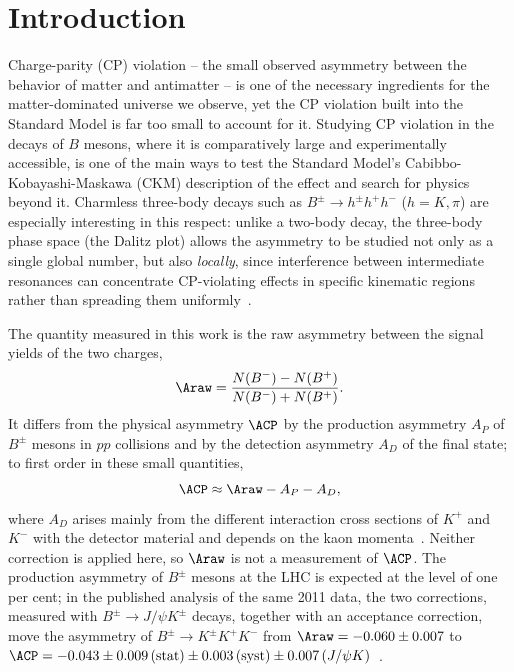 \section{Introduction}
\label{sec:intro}
Charge-parity (CP) violation -- the small observed asymmetry between the behavior of matter and antimatter -- is one of the necessary ingredients for the matter-dominated universe we observe, yet the CP violation built into the Standard Model is far too small to account for it. Studying CP violation in the decays of $B$ mesons, where it is comparatively large and experimentally accessible, is one of the main ways to test the Standard Model's Cabibbo-Kobayashi-Maskawa (CKM) description of the effect and search for physics beyond it. Charmless three-body decays such as $B^{\pm}\to h^{\pm}h^{+}h^{-}$ ($h=K,\pi$) are especially interesting in this respect: unlike a two-body decay, the three-body phase space (the Dalitz plot) allows the asymmetry to be studied not only as a single global number, but also \emph{locally}, since interference between intermediate resonances can concentrate CP-violating effects in specific kinematic regions rather than spreading them uniformly~\cite{lhcb_cpv_prd2023,lhcb_cpv_paper}.

The quantity measured in this work is the raw asymmetry between the signal yields of the two charges,
\begin{equation}
\Araw=\frac{N(B^-)-N(B^+)}{N(B^-)+N(B^+)} .
\label{eq:araw}
\end{equation}
It differs from the physical asymmetry $\ACP$ by the production asymmetry $A_P$ of $B^\pm$ mesons in $pp$ collisions and by the detection asymmetry $A_D$ of the final state; to first order in these small quantities,
\begin{equation}
\ACP\approx\Araw-A_P-A_D ,
\label{eq:acp}
\end{equation}
where $A_D$ arises mainly from the different interaction cross sections of $K^+$ and $K^-$ with the detector material and depends on the kaon momenta~\cite{lhcb_cpv_prd2023}. Neither correction is applied here, so $\Araw$ is not a measurement of $\ACP$. The production asymmetry of $B^\pm$ mesons at the LHC is expected at the level of one per cent; in the published analysis of the same 2011 data, the two corrections, measured with $B^\pm\to J/\psi K^\pm$ decays, together with an acceptance correction, move the asymmetry of $B^\pm\to K^\pm K^+K^-$ from $\Araw=-0.060\pm0.007$ to $\ACP=-0.043\pm0.009\,(\text{stat})\pm0.003\,(\text{syst})\pm0.007\,(J/\psi K)$~\cite{lhcb_cpv_2013}.

